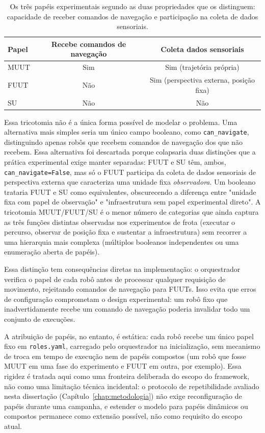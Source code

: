 \begin{table}[H]
\centering
\caption{Os três papéis experimentais segundo as duas propriedades que os
distinguem: capacidade de receber comandos de navegação e participação na
coleta de dados sensoriais.}
\label{tab:papeis_muut_fuut_su}
\begin{tabular}{@{}lcc@{}}
\toprule
\textbf{Papel} & \textbf{Recebe comandos de navegação} & \textbf{Coleta dados sensoriais} \\
\midrule
MUUT & Sim & Sim (trajetória própria) \\
FUUT & Não & Sim (perspectiva externa, posição fixa) \\
SU   & Não & Não \\
\bottomrule
\end{tabular}
\end{table}

Essa tricotomia não é a única forma possível de modelar o problema. Uma
alternativa mais simples seria um único campo booleano, como
\texttt{can\_\allowbreak navigate}, distinguindo apenas robôs que recebem comandos de
navegação dos que não recebem. Essa alternativa foi descartada porque
colapsaria duas distinções que a prática experimental exige manter separadas:
FUUT e SU têm, ambos, \texttt{can\_\allowbreak navigate=False}, mas só o FUUT participa
da coleta de dados sensoriais de perspectiva externa que caracteriza uma
unidade fixa \textit{observadora}. Um booleano trataria FUUT e SU como
equivalentes, obscurecendo a diferença entre "unidade fixa com papel de
observação" e "infraestrutura sem papel experimental direto". A tricotomia
MUUT/FUUT/SU é o menor número de categorias que ainda captura as três funções
distintas observadas nos experimentos de frota (executar o percurso,
observar de posição fixa e sustentar a infraestrutura) sem recorrer a uma
hierarquia mais complexa (múltiplos booleanos independentes ou uma
enumeração aberta de papéis).

Essa distinção tem consequências diretas na implementação: o orquestrador verifica
o papel de cada robô antes de processar qualquer requisição de movimento, rejeitando
comandos de navegação para FUUTs. Isso evita que erros de configuração comprometam
o design experimental: um robô fixo que inadvertidamente recebe um comando de
navegação poderia invalidar todo um conjunto de execuções.

A atribuição de papéis, no entanto, é estática: cada robô recebe um único
papel fixo em \texttt{roles.\allowbreak yaml}, carregado pelo orquestrador na
inicialização, sem mecanismo de troca em tempo de execução nem de papéis
compostos (um robô que fosse MUUT em uma fase do experimento e FUUT em outra,
por exemplo). Essa rigidez é tratada aqui como uma fronteira deliberada do
escopo do framework, não como uma limitação técnica incidental: o protocolo
de repetibilidade avaliado nesta dissertação (Capítulo~\ref{chap:metodologia})
não exige reconfiguração de papéis durante uma campanha, e estender o modelo
para papéis dinâmicos ou compostos permanece como extensão possível, não como
requisito do escopo atual.

